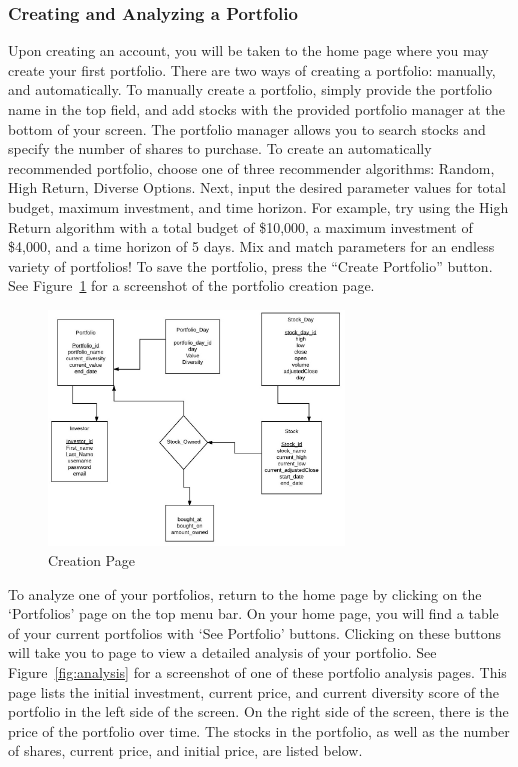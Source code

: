 \documentclass{article}
\begin{document}
\subsubsection{Creating and Analyzing a Portfolio}
Upon creating an account, you will be taken to the home page where you may create your first portfolio. There are two ways of creating a portfolio: manually, and automatically. To manually create a portfolio, simply provide the portfolio name in the top field, and add stocks with the provided portfolio manager at the bottom of your screen. The portfolio manager allows you to search stocks and specify the number of shares to purchase. To create an automatically recommended portfolio, choose one of three recommender algorithms: Random, High Return, Diverse Options. Next, input the desired parameter values for total budget, maximum investment, and time horizon. For example, try using the High Return algorithm with a total budget of \$10,000, a maximum investment of \$4,000, and a time horizon of 5 days. Mix and match parameters for an endless variety of portfolios! To save the portfolio, press the ``Create Portfolio'' button. See Figure~\ref{fig:creation} for a screenshot of the portfolio creation page.

\begin{figure}[H]
\begin{center}
\includegraphics[width=0.7\textwidth]{db_diagram}
\caption{\label{fig:creation} Creation Page}
\end{center}
\end{figure}

To analyze one of your portfolios, return to the home page by clicking on the `Portfolios' page on the top menu bar. On your home page, you will find a table of your current portfolios with `See Portfolio' buttons. Clicking on these buttons will take you to page to view a detailed analysis of your portfolio. See Figure~\ref{fig:analysis} for a screenshot of one of these portfolio analysis pages. This page lists the initial investment, current price, and current diversity score of the portfolio in the left side of the screen. On the right side of the screen, there is the price of the portfolio over time. The stocks in the portfolio, as well as the number of shares, current price, and initial price, are listed below. 
\end{document}
